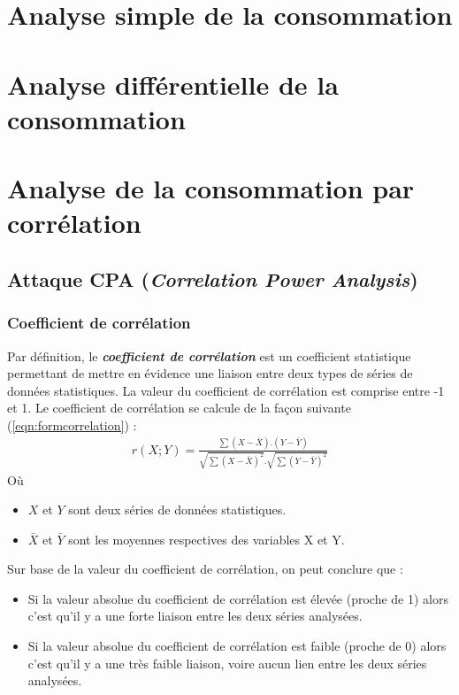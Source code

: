 \documentclass[oneside]{book}
\begin{document}
\section{Analyse simple de la consommation}
\label{sec:Introduction}

\section{Analyse différentielle de la consommation}
\label{sec:Introduction}

\section{Analyse de la consommation par corrélation}
\label{sec:Introduction}

\subsection{Attaque CPA (\textit{Correlation Power Analysis})}
\label{sec:CPA}


\subsubsection{Coefficient de corrélation}
\label{subsec:correlation}
Par définition, le \textbf{\textit{coefficient de corrélation}} est un coefficient statistique permettant de mettre en évidence une liaison entre deux types de séries de données statistiques. La valeur du coefficient de corrélation est comprise entre -1 et 1. Le coefficient de corrélation se calcule de la façon suivante (\ref{eqn:formcorrelation}) :
\begin{gather}
	r(X;Y) = \frac{\sum(X-\bar{X}).(Y-\bar{Y}) }{\sqrt{\sum(X-\bar{X})^2}.\sqrt{\sum(Y-\bar{Y})^2}}\label{eqn:formcorrelation}
\end{gather}
Où 
\begin{itemize}
\item $X$ et $Y$ sont deux séries de données statistiques.
\item $\bar{X}$ et $\bar{Y}$ sont les moyennes respectives des variables X et Y.\vspace{0.4 cm}
\end{itemize}
Sur base de la valeur du coefficient de corrélation, on peut conclure que :
\begin{itemize}
\item Si la valeur absolue du coefficient de corrélation est élevée (proche de 1) alors c'est qu'il y a une forte liaison entre les deux séries analysées.
\item Si la valeur absolue du coefficient de corrélation est faible (proche de 0) alors c'est qu'il y a une très faible liaison, voire aucun lien entre les deux séries analysées.
\end{itemize}
\end{document}
